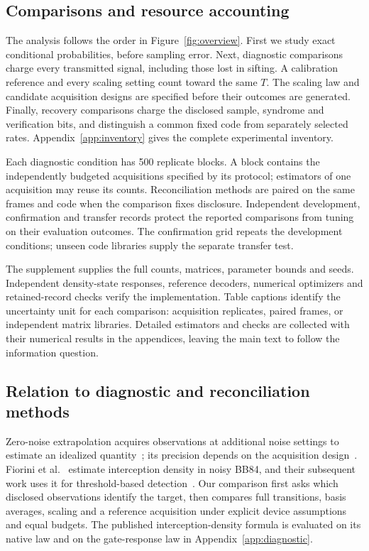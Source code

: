 \documentclass[manuscript,screen,review,anonymous]{acmart}
\begin{document}
\subsection{Comparisons and resource accounting}
The analysis follows the order in Figure~\ref{fig:overview}. First we study exact
conditional probabilities, before sampling error. Next, diagnostic comparisons
charge every transmitted signal, including those lost in sifting. A calibration
reference and every scaling setting count toward the same $T$. The scaling law
and candidate acquisition designs are specified before their outcomes are generated.
Finally, recovery comparisons charge the disclosed sample, syndrome and verification
bits, and distinguish a common fixed code from separately selected rates.
Appendix~\ref{app:inventory} gives the complete experimental inventory.

Each diagnostic condition has 500 replicate blocks. A block contains the
independently budgeted acquisitions specified by its protocol; estimators of
one acquisition may reuse its counts. Reconciliation methods are paired on
the same frames and code when the comparison fixes disclosure. Independent
development, confirmation and transfer records protect the reported comparisons
from tuning on their evaluation outcomes. The confirmation grid repeats the
development conditions; unseen code libraries supply the separate transfer test.

The supplement supplies the full counts, matrices, parameter bounds and seeds.
Independent density-state responses, reference decoders, numerical optimizers
and retained-record checks verify the implementation. Table captions identify
the uncertainty unit for each comparison: acquisition replicates, paired frames,
or independent matrix libraries. Detailed estimators and checks are collected
with their numerical results in the appendices, leaving the main text to follow
the information question.

\subsection{Relation to diagnostic and reconciliation methods}
Zero-noise extrapolation acquires observations at additional noise settings
to estimate an idealized quantity~\cite{temme2017,li2017,giurgicatiron2020};
its precision depends on the acquisition design~\cite{krebsbach2022}.
Fiorini et al.~\cite{fiorini2024} estimate interception density in noisy BB84,
and their subsequent work uses it for threshold-based detection~\cite{fiorini2026}.
Our comparison first asks which disclosed observations identify the target,
then compares full transitions, basis averages, scaling and a reference
acquisition under explicit device assumptions and equal budgets.
The published interception-density formula is evaluated on its native law and
on the gate-response law in Appendix~\ref{app:diagnostic}.
\end{document}
